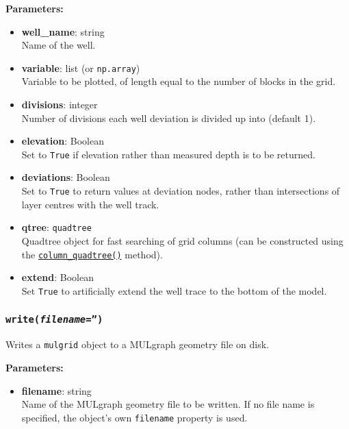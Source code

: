 
\textbf{Parameters:}
\begin{itemize}
\item \textbf{well\_name}: string\\
  Name of the well.
\item \textbf{variable}: list (or \texttt{np.array})\\
  Variable to be plotted, of length equal to the number of blocks in the grid.
\item \textbf{divisions}: integer\\
  Number of divisions each well deviation is divided up into (default 1).
\item \textbf{elevation}: Boolean\\
  Set to \texttt{True} if elevation rather than measured depth is to be returned.
\item \textbf{deviations}: Boolean\\
  Set to \texttt{True} to return values at deviation nodes, rather than intersections of layer centres with the well track.
\item \textbf{qtree}: \texttt{quadtree}\\
  Quadtree object for fast searching of grid columns (can be constructed using the \hyperref[sec:mulgrid:column_quadtree]{\texttt{column\_quadtree()}} method).
\item \textbf{extend}: Boolean\\
  Set \texttt{True} to artificially extend the well trace to the bottom of the model.
\end{itemize}

\begin{snugshade}\subsubsection{\texttt{write(\emph{filename}='')}}\end{snugshade}
\label{sec:mulgrid:write}

Writes a \texttt{mulgrid} object to a MULgraph geometry file on disk.

\textbf{Parameters:}
\begin{itemize}
\item \textbf{filename}: string\\
  Name of the MULgraph geometry file to be written.  If no file name is specified, the object's own \texttt{filename} property is used.
\end{itemize}

